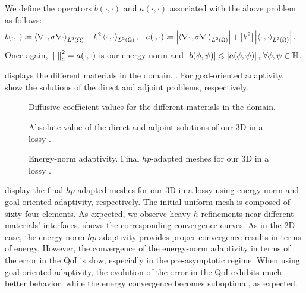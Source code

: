 \noindent We define the operators $b(\cdot ,\cdot)$  and $a(\cdot ,\cdot)$ associated with the above problem as follows:
\begin{align}
  b(\cdot ,\cdot) & \coloneqq   \left<\nabla \cdot\,,\sigma \nabla \cdot\right>_{L^{2}(\Omega)} - k^2 \left<\cdot\,,\cdot\right>_{L^{2}(\Omega)}, & a(\cdot ,\cdot) & \coloneqq  \left|\left<\nabla \cdot\,,\sigma \nabla \cdot\right>_{L^{2}(\Omega)}\right| + \left|k^{2}\right| \left|\left<\cdot\,,\cdot\right>_{L^{2}(\Omega)}\right|.
  \label{eq:form_helm3d}
\end{align}
Once again, $\left\|\cdot\right\|_e^2 =a(\cdot, \cdot)$ is our energy norm and $\left|b(\phi,\psi)\right| \leqslant \left|a(\phi,\psi)\right|, \, \forall \phi,\psi \in \mathbb{H}$.

 displays the different materials in the domain.  . For goal-oriented adaptivity,  show the solutions of the direct and adjoint problems, respectively.

\begin{figure}
  \caption{Diffusive coefficient values for the different materials in the domain.}
  \label{fig:matHelmtresD}
\end{figure}

\begin{figure}
  \caption{Absolute value of the direct and adjoint solutions of our $3$D  in a lossy .}
\end{figure}

\pagebreak


\begin{figure}
  \caption{Energy-norm adaptivity. Final $hp$-adapted meshes for our $3$D  in a lossy .}
  \label{fig:Helm3DGOANonlevels}
\end{figure}

 display the final $hp$-adapted meshes for our $3$D  in a lossy  using energy-norm and goal-oriented adaptivity, respectively. The initial uniform mesh is composed of sixty-four  elements. As expected, we observe heavy $h$-refinements near different materials' interfaces.  shows the corresponding convergence curves. As in the $2$D case, the energy-norm $hp$-adaptivity provides proper convergence results in terms of energy. However, the convergence of the energy-norm adaptivity in terms of the error in the QoI is slow, especially in the pre-asymptotic regime. When using goal-oriented adaptivity, the evolution of the error in the QoI exhibits much better behavior, while the energy convergence becomes suboptimal, as expected.


